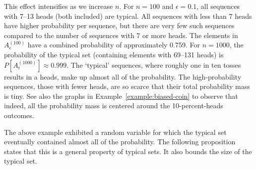 \begin{example}
This effect intensifies as we increase $n$. For $n = 100$ and $\epsilon = 0.1$, all sequences with 7--13 heads (both included) are typical. All sequences with less than 7 heads have higher probability per sequence, but there are very few such sequences compared to the number of sequences with 7 or more heads. The elements in $A^{(100)}_{\epsilon}$ have a combined probability of approximately 0.759. For $n = 1000$, the probability of the typical set (containing elements with 69--131 heads) is $P[A^{(1000)}_{\epsilon}] \approx 0.999$. The `typical' sequences, where roughly one in ten tosses results in a heads, make up almost all of the probability. The high-probability sequences, those with fewer heads, are so scarce that their total probability mass is tiny. See also the graphs in Example~\ref{example:biased-coin} to observe that indeed, all the probability mass is centered around the 10-percent-heads outcomes.
\end{example}

The above example exhibited a random variable for which the typical set eventually contained almost all of the probability. The following proposition states that this is a general property of typical sets. It also bounds the size of the typical set.

